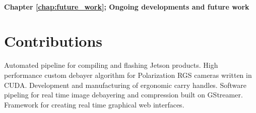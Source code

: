 \paragraph{Chapter \ref{chap:future_work}; Ongoing developments and future work}



\section{Contributions}
Automated pipeline for compiling and flashing Jetson products.
High performance custom debayer algorithm for Polarization RGS cameras written in CUDA.
Development and manufacturing of ergonomic carry handles.
Software pipeling for real time image debayering and compression built on GStreamer.
Framework for creating real time graphical web interfaces.
